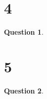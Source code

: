 \documentclass{article}
\newtheorem{question}{Question}
\begin{document}
\break

\section*{4}
\begin{question}
    
\end{question}

\break

\section*{5}
\begin{question}
    
\end{question}
\end{document}
